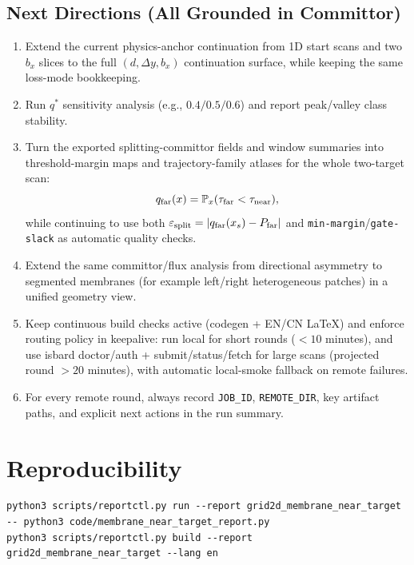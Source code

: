 \documentclass[11pt]{article}
\begin{document}
\subsection*{Next Directions (All Grounded in Committor)}
\begin{enumerate}
  \item Extend the current physics-anchor continuation from 1D start scans and two $b_x$ slices to the full $(d,\Delta y,b_x)$ continuation surface, while keeping the same loss-mode bookkeeping.
  \item Run $q^*$ sensitivity analysis (e.g., $0.4/0.5/0.6$) and report peak/valley class stability.
  \item Turn the exported splitting-committor fields and window summaries into threshold-margin maps and trajectory-family atlases for the whole two-target scan:
  \[
  q_{\rm far}(x)=\mathbb P_x(\tau_{\rm far}<\tau_{\rm near}),
  \]
  while continuing to use both $\varepsilon_{\rm split}=|q_{\rm far}(x_s)-P_{\rm far}|$ and \texttt{min-margin}/\texttt{gate-slack} as automatic quality checks.
  \item Extend the same committor/flux analysis from directional asymmetry to segmented membranes (for example left/right heterogeneous patches) in a unified geometry view.
  \item Keep continuous build checks active (codegen + EN/CN LaTeX) and enforce routing policy in keepalive: run local for short rounds ($<10$ minutes), and use isbard doctor/auth + submit/status/fetch for large scans (projected round $>20$ minutes), with automatic local-smoke fallback on remote failures.
  \item For every remote round, always record \texttt{JOB\_ID}, \texttt{REMOTE\_DIR}, key artifact paths, and explicit next actions in the run summary.
\end{enumerate}

\section*{Reproducibility}
\begin{verbatim}
python3 scripts/reportctl.py run --report grid2d_membrane_near_target -- python3 code/membrane_near_target_report.py
python3 scripts/reportctl.py build --report grid2d_membrane_near_target --lang en
\end{verbatim}
\end{document}
